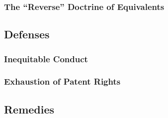 

\subsubsection{The ``Reverse'' Doctrine of Equivalents}


\subsection{Defenses}

\subsubsection{Inequitable Conduct}


\subsubsection{Exhaustion of Patent Rights}



\subsection{Remedies}


